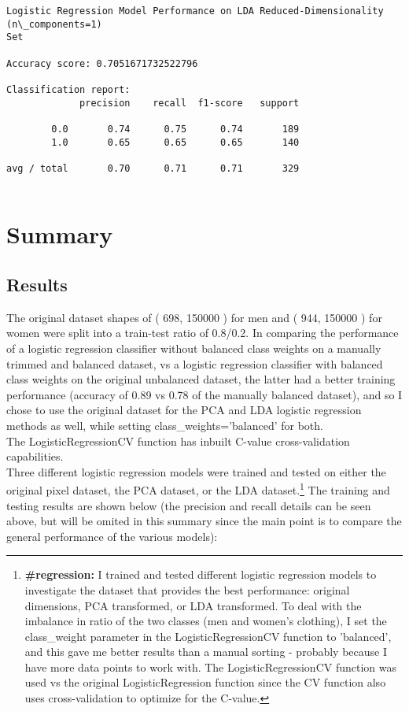 \documentclass[11pt]{article}
\begin{document}
    \begin{Verbatim}[commandchars=\\\{\},fontsize=\footnotesize]
Logistic Regression Model Performance on LDA Reduced-Dimensionality (n\_components=1)
Set

Accuracy score: 0.7051671732522796

Classification report:
             precision    recall  f1-score   support

        0.0       0.74      0.75      0.74       189
        1.0       0.65      0.65      0.65       140

avg / total       0.70      0.71      0.71       329


    \end{Verbatim}
\newpage
    \section{Summary}

\subsection{Results}

The original dataset shapes of ( 698, 150000 ) for men and ( 944, 150000
) for women were split into a train-test ratio of 0.8/0.2. In comparing
the performance of a logistic regression classifier without balanced
class weights on a manually trimmed and balanced dataset, vs a logistic
regression classifier with balanced class weights on the original
unbalanced dataset, the latter had a better training performance
(accuracy of 0.89 vs 0.78 of the manually balanced dataset), and so I
chose to use the original dataset for the PCA and LDA logistic
regression methods as well, while setting class\_weights='balanced' for
both.\\

The LogisticRegressionCV function has inbuilt C-value cross-validation
capabilities.\\

Three different logistic regression models were trained and tested on
either the original pixel dataset, the PCA dataset, or the LDA dataset.\footnote{\textbf{\#regression: }I trained and tested different logistic regression models to investigate the dataset that provides the best performance: original dimensions, PCA transformed, or LDA transformed. To deal with the imbalance in ratio of the two classes (men and women's clothing), I set the class\_weight parameter in the LogisticRegressionCV function to 'balanced', and this gave me better results than a manual sorting - probably because I have more data points to work with. The LogisticRegressionCV function was used vs the original LogisticRegression function since the CV function also uses cross-validation to optimize for the C-value.}
The training and testing results are shown below (the precision and
recall details can be seen above, but will be omited in this summary
since the main point is to compare the general performance of the
various models):
\end{document}

